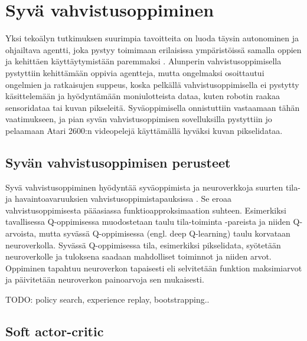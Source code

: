 \documentclass[utf8]{gradu3}
\begin{document}
\section{Syvä vahvistusoppiminen}

Yksi tekoälyn tutkimuksen suurimpia tavoitteita on luoda täysin autonominen ja ohjailtava agentti, joka pystyy toimimaan erilaisissa ympäristöissä samalla oppien ja kehittäen käyttäytymistään paremmaksi \parencite{arulkumaran2017brief}. Alunperin vahvistusoppimisella pystyttiin kehittämään oppivia agentteja, mutta ongelmaksi osoittautui ongelmien ja ratkaisujen suppeus, koska pelkällä vahvistusoppimisella ei pystytty käsittelemään ja hyödyntämään moniulotteista dataa, kuten robotin raakaa sensoridataa tai kuvan pikseleitä. Syväoppimisella onnistuttiin vastaamaan tähän vaatimukseen, ja pian syvän vahvistusoppimisen sovelluksilla pystyttiin jo pelaamaan Atari 2600:n videopelejä käyttämällä hyväksi kuvan pikselidataa.

\subsection{Syvän vahvistusoppimisen perusteet}

Syvä vahvistusoppiminen hyödyntää syväoppimista ja neuroverkkoja suurten tila- ja havaintoavaruuksien vahvistusoppimistapauksissa \parencite{li2018deep}. Se eroaa vahvistusoppimisesta pääasiassa funktioapproksimaation suhteen. Esimerkiksi tavallisessa Q-oppimisessa muodostetaan taulu tila-toiminta -pareista ja niiden Q-arvoista, mutta syvässä Q-oppimisessa (engl. deep Q-learning) taulu korvataan neuroverkolla. Syvässä Q-oppimisessa tila, esimerkiksi pikselidata, syötetään neuroverkolle ja tuloksena saadaan mahdolliset toiminnot ja niiden arvot. Oppiminen tapahtuu neuroverkon tapaisesti eli selvitetään funktion maksimiarvot ja päivitetään neuroverkon painoarvoja sen mukaisesti.

TODO: policy search, experience replay, bootstrapping..

\subsection{Soft actor-critic}
\end{document}
